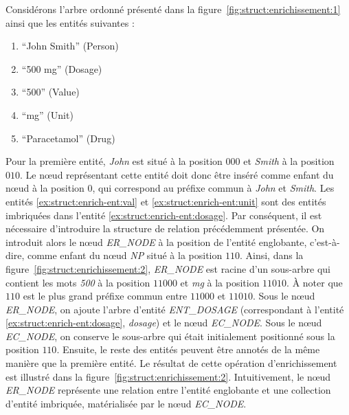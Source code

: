 \begin{example}
    Considérons l'arbre ordonné présenté dans la figure~\ref{fig:struct:enrichissement:1} ainsi que les entités suivantes :
    \begin{multicols}{3}
        \begin{enumerate}
            \item \enquote{John Smith} (Person) \label{ex:struct:enrich-ent:person}
            \item \enquote{500 mg} (Dosage) \label{ex:struct:enrich-ent:dosage}
            \item \enquote{500} (Value) \label{ex:struct:enrich-ent:val}
            \item \enquote{mg} (Unit) \label{ex:struct:enrich-ent:unit}
            \item \enquote{Paracetamol} (Drug) \label{ex:struct:enrich-ent:drug}
        \end{enumerate}
    \end{multicols}

    Pour la première entité, \emph{John} est situé à la position $000$ et \emph{Smith} à la position $010$.
    Le nœud représentant cette entité doit donc être inséré comme enfant du nœud à la position $0$, qui correspond au préfixe commun à \emph{John} et \emph{Smith}.
    Les entités \ref{ex:struct:enrich-ent:val} et \ref{ex:struct:enrich-ent:unit} sont des entités imbriquées dans l'entité \ref{ex:struct:enrich-ent:dosage}.
    Par conséquent, il est nécessaire d'introduire la structure de relation précédemment présentée.
    On introduit alors le nœud \emph{ER\_NODE} à la position de l'entité englobante, c'est-à-dire, comme enfant du nœud \emph{NP} situé à la position $110$.
    Ainsi, dans la figure~\ref{fig:struct:enrichissement:2}, \emph{ER\_NODE} est racine d'un sous-arbre qui contient les mots \emph{500} à la position $11000$ et \emph{mg} à la position $11010$.
    À noter que $110$ est le plus grand préfixe commun entre $11000$ et  $11010$.
    Sous le nœud \emph{ER\_NODE}, on ajoute l'arbre d'entité \emph{ENT\_DOSAGE} (correspondant à l'entité \ref{ex:struct:enrich-ent:dosage}, \emph{dosage}) et le nœud \emph{EC\_NODE}.
    Sous le nœud \emph{EC\_NODE}, on conserve le sous-arbre qui était initialement positionné sous la position $110$.
    Ensuite, le reste des entités peuvent être annotés de la même manière que la première entité.
    Le résultat de cette opération d'enrichissement est illustré dans la figure~\ref{fig:struct:enrichissement:2}.
    Intuitivement, le nœud \emph{ER\_NODE} représente une relation entre l'entité englobante et une collection d'entité imbriquée, matérialisée par le nœud \emph{EC\_NODE}.
\end{example}

